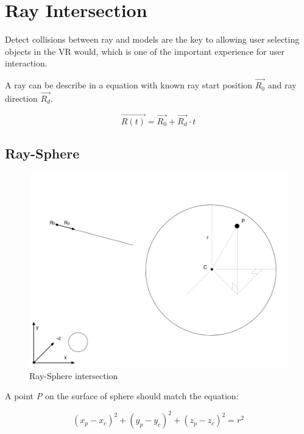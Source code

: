 \section{Ray Intersection}

Detect collisions between ray and models are the key to allowing user selecting objects in the VR would, which is one of the important experience for user interaction.

A ray can be describe in a equation with known ray start position \emph{$\overrightarrow{R_0}$} and ray direction \emph{$\overrightarrow{R_d}$}.

\begin{equation}
\label{equ:ray-t}
\overrightarrow{R(t)} = \overrightarrow{R_0} + \overrightarrow{R_d} \cdot t
\end{equation}

\subsection{Ray-Sphere}

\begin{figure}[H]
\caption{Ray-Sphere intersection}
\label{fig:ray-sphere}
\centering
\includegraphics[width=\linewidth]{Figures/ray-sphere-intersection.png}
\decoRule
\end{figure}

A point \emph{P} on the surface of sphere should match the equation:

\begin{equation}
\label{equ:sphere-surface}
(x_p - x_c)^2 + (y_p - y_c)^2 + (z_p - z_c)^2 = r^2
\end{equation}


